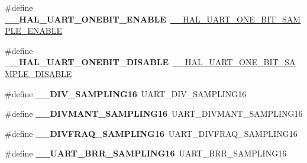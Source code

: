 \begin{DoxyCompactItemize}
\item 
\#define {\bfseries \+\_\+\+\_\+\+H\+A\+L\+\_\+\+U\+A\+R\+T\+\_\+\+O\+N\+E\+B\+I\+T\+\_\+\+E\+N\+A\+B\+LE}~\hyperlink{group___u_a_r_t___exported___macros_ga3524747e5896296ab066d786431503ce}{\+\_\+\+\_\+\+H\+A\+L\+\_\+\+U\+A\+R\+T\+\_\+\+O\+N\+E\+\_\+\+B\+I\+T\+\_\+\+S\+A\+M\+P\+L\+E\+\_\+\+E\+N\+A\+B\+LE}\hypertarget{group___h_a_l___u_a_r_t___aliased___defines_gaf1ec2145d7a73ee2f74ec334c8210092}{}\label{group___h_a_l___u_a_r_t___aliased___defines_gaf1ec2145d7a73ee2f74ec334c8210092}

\item 
\#define {\bfseries \+\_\+\+\_\+\+H\+A\+L\+\_\+\+U\+A\+R\+T\+\_\+\+O\+N\+E\+B\+I\+T\+\_\+\+D\+I\+S\+A\+B\+LE}~\hyperlink{group___u_a_r_t___exported___macros_ga2dbd7e6592e8c5999f817b69f0fd24bb}{\+\_\+\+\_\+\+H\+A\+L\+\_\+\+U\+A\+R\+T\+\_\+\+O\+N\+E\+\_\+\+B\+I\+T\+\_\+\+S\+A\+M\+P\+L\+E\+\_\+\+D\+I\+S\+A\+B\+LE}\hypertarget{group___h_a_l___u_a_r_t___aliased___defines_ga93fcc521745111012558544b198be1ce}{}\label{group___h_a_l___u_a_r_t___aliased___defines_ga93fcc521745111012558544b198be1ce}

\item 
\#define {\bfseries \+\_\+\+\_\+\+D\+I\+V\+\_\+\+S\+A\+M\+P\+L\+I\+N\+G16}~U\+A\+R\+T\+\_\+\+D\+I\+V\+\_\+\+S\+A\+M\+P\+L\+I\+N\+G16\hypertarget{group___h_a_l___u_a_r_t___aliased___defines_ga95b08a06aee2ed42542ac95224cf13a8}{}\label{group___h_a_l___u_a_r_t___aliased___defines_ga95b08a06aee2ed42542ac95224cf13a8}

\item 
\#define {\bfseries \+\_\+\+\_\+\+D\+I\+V\+M\+A\+N\+T\+\_\+\+S\+A\+M\+P\+L\+I\+N\+G16}~U\+A\+R\+T\+\_\+\+D\+I\+V\+M\+A\+N\+T\+\_\+\+S\+A\+M\+P\+L\+I\+N\+G16\hypertarget{group___h_a_l___u_a_r_t___aliased___defines_gaae0a8a1c78ef85c5d4e980f123dce2cb}{}\label{group___h_a_l___u_a_r_t___aliased___defines_gaae0a8a1c78ef85c5d4e980f123dce2cb}

\item 
\#define {\bfseries \+\_\+\+\_\+\+D\+I\+V\+F\+R\+A\+Q\+\_\+\+S\+A\+M\+P\+L\+I\+N\+G16}~U\+A\+R\+T\+\_\+\+D\+I\+V\+F\+R\+A\+Q\+\_\+\+S\+A\+M\+P\+L\+I\+N\+G16\hypertarget{group___h_a_l___u_a_r_t___aliased___defines_ga165ca293ce5aa1dc825ce6e69f104f99}{}\label{group___h_a_l___u_a_r_t___aliased___defines_ga165ca293ce5aa1dc825ce6e69f104f99}

\item 
\#define {\bfseries \+\_\+\+\_\+\+U\+A\+R\+T\+\_\+\+B\+R\+R\+\_\+\+S\+A\+M\+P\+L\+I\+N\+G16}~U\+A\+R\+T\+\_\+\+B\+R\+R\+\_\+\+S\+A\+M\+P\+L\+I\+N\+G16\hypertarget{group___h_a_l___u_a_r_t___aliased___defines_ga4ef81a279eab794f777deede4ef777cd}{}\label{group___h_a_l___u_a_r_t___aliased___defines_ga4ef81a279eab794f777deede4ef777cd}


\end{DoxyCompactItemize}
